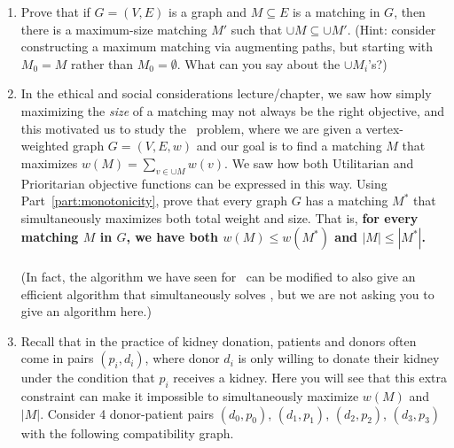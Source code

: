 \documentclass[11pt]{article}
\begin{document}
\begin{enumerate}
        \begin{enumerate}
        \item Prove that if $G=(V,E)$ is a graph and $M\subseteq E$ is a matching in $G$, then there is a maximum-size matching $M'$ such that $\cup M \subseteq \cup M'$.  (Hint: consider constructing a maximum matching via augmenting paths, but starting with $M_0=M$ rather than $M_0=\emptyset$. What can you say about the $\cup {M_i}$'s?) \label{part:monotonicity}\\

        \item   In the ethical and social considerations lecture/chapter, we saw how simply maximizing the {\em size} of a matching may not always be the right objective, and this motivated us to study the \MaximumVertexWeightedMatching\ problem, where we are given a vertex-weighted graph $G=(V,E,w)$ and our goal is to find a matching $M$ that maximizes $w(M) = \sum_{v \in \cup M} w(v)$.
        We saw how both Utilitarian and Prioritarian objective functions can be expressed in this way.
        Using Part~\ref{part:monotonicity}, prove that every graph $G$ has a matching $M^*$ that simultaneously maximizes both total weight and size.  That is, \textbf{for every matching $M$ in $G$, we have
        both $w(M)\leq w(M^*)$ and $|M|\leq |M^*|$.\\}
        \ \\
        (In fact, the algorithm we have seen for \MaximumMatching\ can be modified to also give an efficient algorithm that simultaneously solves \MaximumVertexWeightedMatching, but we are not asking you to give an algorithm here.)

        \bigskip
        \item
        \label{part:VertexWeightedMatching-pairs}
        Recall that in the practice of kidney donation, patients and donors often come in pairs $(p_i,d_i)$, where donor $d_i$ is only willing to donate their kidney under the condition that $p_i$ receives a kidney.  Here you will see that this extra constraint can make it impossible to simultaneously maximize $w(M)$ and $|M|$.  Consider 4 donor-patient pairs $(d_0,p_0)$, $(d_1,p_1)$, $(d_2,p_2)$, $(d_3,p_3)$ with the following compatibility graph.

\end{enumerate}
\end{enumerate}
\end{document}
